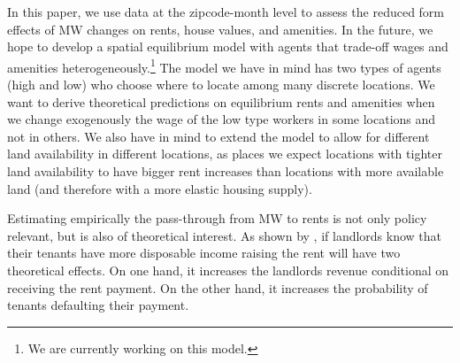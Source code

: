  
In this paper, we use data at the zipcode-month level to assess the reduced form effects of MW changes on rents, house values, and amenities. In the future, we hope to develop a spatial equilibrium model with agents that trade-off wages and amenities heterogeneously.\footnote{We are currently working on this model.} The model we have in mind has two types of agents (high and low) who choose where to locate among many discrete locations. We want to derive theoretical predictions on equilibrium rents and amenities when we change exogenously the wage of the low type workers in some locations and not in others. We also have in mind to extend the model to allow for different land availability in different locations, as places we expect locations with tighter land availability to have bigger rent increases than locations with more available land (and therefore with a more elastic housing supply). 

Estimating empirically the pass-through from MW to rents is not only policy relevant, but is also of theoretical interest. As shown by \textcite{agarwal2019minimum}, if landlords know that their tenants have more disposable income raising the rent will have two theoretical effects. On one hand, it increases the landlords revenue conditional on receiving the rent payment. On the other hand, it increases the probability of tenants defaulting their payment. 

